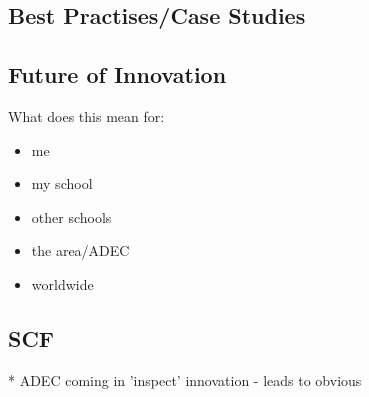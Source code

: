 \subsection{Best Practises/Case Studies}

\subsection{Future of Innovation}


What does this mean for:
\begin{itemize}
\item me
\item my school
\item other schools
\item the area/ADEC
\item worldwide
\end{itemize}

\subsection{SCF}
* ADEC coming in 'inspect' innovation - leads to obvious